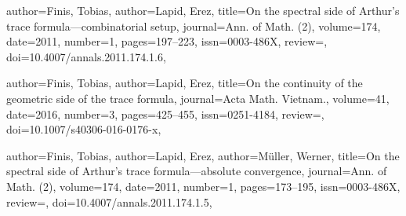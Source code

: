 \documentclass[11pt]{amsart}
\theoremstyle{remark}
\begin{document}
\begin{bibdiv}
\begin{biblist}
%   
%    
%    
    {
       author={Finis, Tobias},
       author={Lapid, Erez},
       title={On the spectral side of Arthur's trace formula---combinatorial setup},
       journal={Ann. of Math. (2)},
       volume={174},
       date={2011},
       number={1},
       pages={197--223},
       issn={0003-486X},
       review={},
       doi={10.4007/annals.2011.174.1.6},
    }

   {
	   author={Finis, Tobias},
	   author={Lapid, Erez},
	   title={On the continuity of the geometric side of the trace formula},
	   journal={Acta Math. Vietnam.},
	   volume={41},
	   date={2016},
	   number={3},
	   pages={425--455},
	   issn={0251-4184},
	   review={},
	   doi={10.1007/s40306-016-0176-x},
	}

    {
       author={Finis, Tobias},
       author={Lapid, Erez},
       author={M{\"u}ller, Werner},
       title={On the spectral side of Arthur's trace formula---absolute
       convergence},
       journal={Ann. of Math. (2)},
       volume={174},
       date={2011},
       number={1},
       pages={173--195},
       issn={0003-486X},
       review={},
       doi={10.4007/annals.2011.174.1.5},
    }
    

\end{biblist}
\end{bibdiv}
\end{document}
